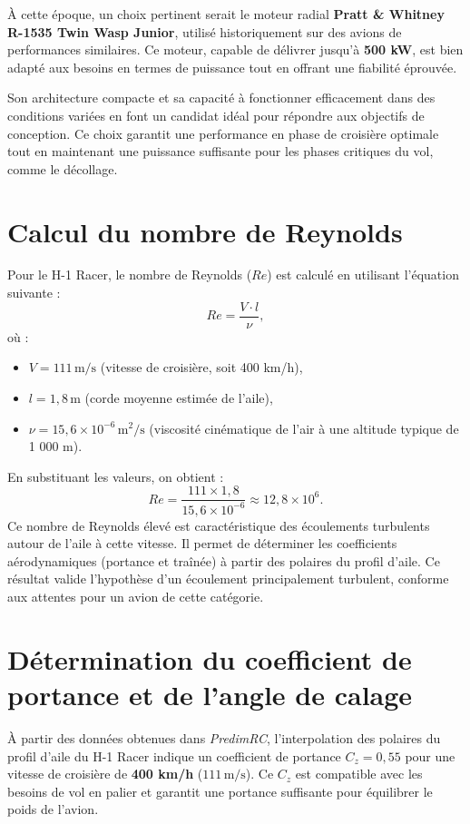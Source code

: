 \documentclass[12pt,a4paper]{article}
\begin{document}
À cette époque, un choix pertinent serait le moteur radial \textbf{Pratt \& Whitney R-1535 Twin Wasp Junior}, utilisé historiquement sur des avions de performances similaires. Ce moteur, capable de délivrer jusqu'à \textbf{500 kW}, est bien adapté aux besoins en termes de puissance tout en offrant une fiabilité éprouvée.

Son architecture compacte et sa capacité à fonctionner efficacement dans des conditions variées en font un candidat idéal pour répondre aux objectifs de conception. Ce choix garantit une performance en phase de croisière optimale tout en maintenant une puissance suffisante pour les phases critiques du vol, comme le décollage.

\section{Calcul du nombre de Reynolds}

Pour le H-1 Racer, le nombre de Reynolds ($Re$) est calculé en utilisant l’équation suivante :
\[
Re = \frac{V \cdot l}{\nu},
\]
où :
\begin{itemize}
    \item $V = 111 \, \text{m/s}$ (vitesse de croisière, soit 400 km/h),
    \item $l = 1{,}8 \, \text{m}$ (corde moyenne estimée de l’aile),
    \item $\nu = 15{,}6 \times 10^{-6} \, \text{m}^2/\text{s}$ (viscosité cinématique de l’air à une altitude typique de 1 000 m).
\end{itemize}

En substituant les valeurs, on obtient :
\[
Re = \frac{111 \times 1{,}8}{15{,}6 \times 10^{-6}} \approx 12{,}8 \times 10^6.
\]
Ce nombre de Reynolds élevé est caractéristique des écoulements turbulents autour de l’aile à cette vitesse. Il permet de déterminer les coefficients aérodynamiques (portance et traînée) à partir des polaires du profil d’aile. Ce résultat valide l’hypothèse d’un écoulement principalement turbulent, conforme aux attentes pour un avion de cette catégorie.

\section{Détermination du coefficient de portance et de l’angle de calage}

À partir des données obtenues dans \textit{PredimRC}, l’interpolation des polaires du profil d’aile du H-1 Racer indique un coefficient de portance $C_z = 0{,}55$ pour une vitesse de croisière de \textbf{400 km/h} ($111 \, \text{m/s}$). Ce $C_z$ est compatible avec les besoins de vol en palier et garantit une portance suffisante pour équilibrer le poids de l’avion.
\end{document}
